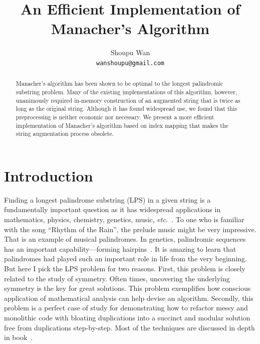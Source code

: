 \documentclass[a4paper,titlepage]{article}
\title{An Efficient Implementation of Manacher's Algorithm}
\author{Shoupu Wan \\
\texttt{wanshoupu@gmail.com} \\
}
\begin{document}
    \maketitle

    \begin{abstract}
        Manacher's algorithm has been shown to be optimal to the longest palindromic substring
        problem.
        Many of the existing implementations of this algorithm, however, unanimously required
        in-memory construction of an augmented string that is twice as long as the original string.
        Although it has found widespread use, we found that this preprocessing is
        neither economic nor necessary.
        We present a more efficient implementation of Manacher's algorithm based
        on index mapping that makes the string augmentation process obsolete.
    \end{abstract}




    \section{Introduction}\label{sec:introduction}

    Finding a longest palindrome substring (LPS) in a given string is a fundamentally important
    question as it has widespread applications in mathematics, physics, chemistry, genetics, music,
    \textit{etc.}~\cite{Manacher:1975, shiu2010data, jeuring1993theories, galil1981string,
    crochemore1994text}.
    To one who is familiar with the song ``Rhythm of the Rain'', the prelude music might be
    very impressive.
    That is an example of musical palindromes.
    In genetics, palindromic sequences has an important capability---forming
    hairpins~\cite{chaos2008palindromelifeorigin}.
    It is amazing to learn that palindromes had played such an important role in life from the
    very beginning.
    But here I pick the LPS problem for two reasons.
    First, this problem is closely related to the study of symmetry.
    Often times, uncovering the underlying symmetry is the key for great solutions.
    This problem exemplifies how conscious application of
    mathematical analysis can help devise an algorithm.
    Secondly, this problem is a perfect case of study for demonstrating how to refactor messy and
    monolithic code with bloating duplications into a succinct and modular solution free
    from duplications step-by-step.
    Most of the techniques are discussed in depth in book~\cite{Wan:book}.
\end{document}
